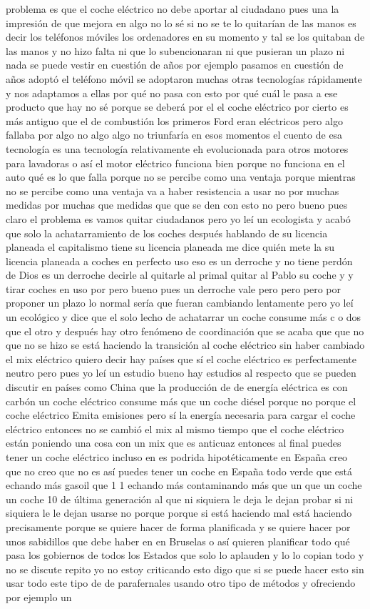 problema es que el coche eléctrico no debe aportar al ciudadano pues una la impresión de que mejora en algo no lo sé si no se te lo quitarían de las manos es decir los teléfonos móviles los ordenadores en su momento y tal se los quitaban de las manos y no hizo falta ni que lo subencionaran ni que pusieran un plazo ni nada se puede vestir en cuestión de años por ejemplo pasamos en cuestión de años adoptó el teléfono móvil se adoptaron muchas otras tecnologías rápidamente y nos adaptamos a ellas por qué no pasa con esto por qué cuál le pasa a ese producto que hay no sé porque se deberá por el el coche eléctrico por cierto es más antiguo que el de combustión los primeros Ford eran eléctricos pero algo fallaba por algo no algo algo no triunfaría en esos momentos el cuento de esa tecnología es una tecnología relativamente eh evolucionada para otros motores para lavadoras o así el motor eléctrico funciona bien porque no funciona en el auto qué es lo que falla porque no se percibe como una ventaja porque mientras no se percibe como una ventaja va a haber resistencia a usar no por muchas medidas por muchas que medidas que que se den con esto no pero bueno pues claro el problema es vamos quitar ciudadanos pero yo leí un ecologista y acabó que solo la achatarramiento de los coches después hablando de su licencia planeada el capitalismo tiene su licencia planeada me dice quién mete la su licencia planeada a coches en perfecto uso eso es un derroche y no tiene perdón de Dios es un derroche decirle al quitarle al primal quitar al Pablo su coche y y tirar coches en uso por pero bueno pues un derroche vale pero pero pero por proponer un plazo lo normal sería que fueran cambiando lentamente pero yo leí un ecológico y dice que el solo lecho de achatarrar un coche consume más c o dos que el otro y después hay otro fenómeno de coordinación que se acaba que que no que no se hizo se está haciendo la transición al coche eléctrico sin haber cambiado el mix eléctrico quiero decir hay países que sí el coche eléctrico es perfectamente neutro pero pues yo leí un estudio bueno hay estudios al respecto que se pueden discutir en países como China que la producción de de energía eléctrica es con carbón un coche eléctrico consume más que un coche diésel porque no porque el coche eléctrico Emita emisiones pero sí la energía necesaria para cargar el coche eléctrico entonces no se cambió el mix al mismo tiempo que el coche eléctrico están poniendo una cosa con un mix que es anticuaz entonces al final puedes tener un coche eléctrico incluso en es podrida hipotéticamente en España creo que no creo que no es así puedes tener un coche en España todo verde que está echando más gasoil que 1 1 echando más contaminando más que un que un coche un coche 10 de última generación al que ni siquiera le deja le dejan probar si ni siquiera le le dejan usarse no porque porque si está haciendo mal está haciendo precisamente porque se quiere hacer de forma planificada y se quiere hacer por unos sabidillos que debe haber en en Bruselas o así quieren planificar todo qué pasa los gobiernos de todos los Estados que solo lo aplauden y lo lo copian todo y no se discute repito yo no estoy criticando esto digo que si se puede hacer esto sin usar todo este tipo de de parafernales usando otro tipo de métodos y ofreciendo por ejemplo un 
